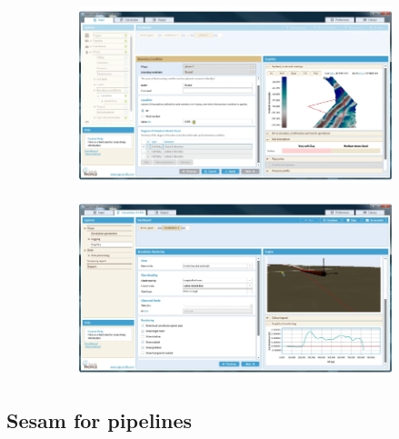 \begin{figure}[!ht]
    \centering
    \caption{Interface gráfica do SAGE Profile.}\label{fig:sageprofile}
    \begin{subfigure}[t]{0.49\textwidth}
        \centering
        \includegraphics[width=\textwidth]{imagens/sage_profile_1}
    \end{subfigure}
    \hfill
    \begin{subfigure}[t]{0.49\textwidth}
        \centering
        \includegraphics[width=\textwidth]{imagens/sage_profile_2}
    \end{subfigure}
\end{figure}


\subsection{Sesam for pipelines}

